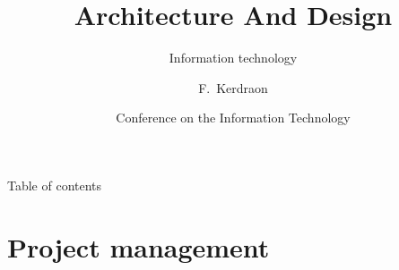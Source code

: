 \documentclass{beamer}
\title[Personal introduction] %
{Architecture And Design}
\subtitle
{Information technology}
\author[Frederic Kerdraon] %
{F.~Kerdraon\inst{1}}%
\institute[University of theoretical physics] %
{
  \inst{1}%
  Department of Computer Science\\
  Global Business Analyst  
}
\date[CFP 2016] %
{Conference on the Information Technology}
\begin{document}
\begin{frame}
  \titlepage
\end{frame}


\begin{frame}{Table of contents}
\begin{multicols}{2}
  \tableofcontents
\end{multicols}
\end{frame}





\section{Project management}
\end{document}
